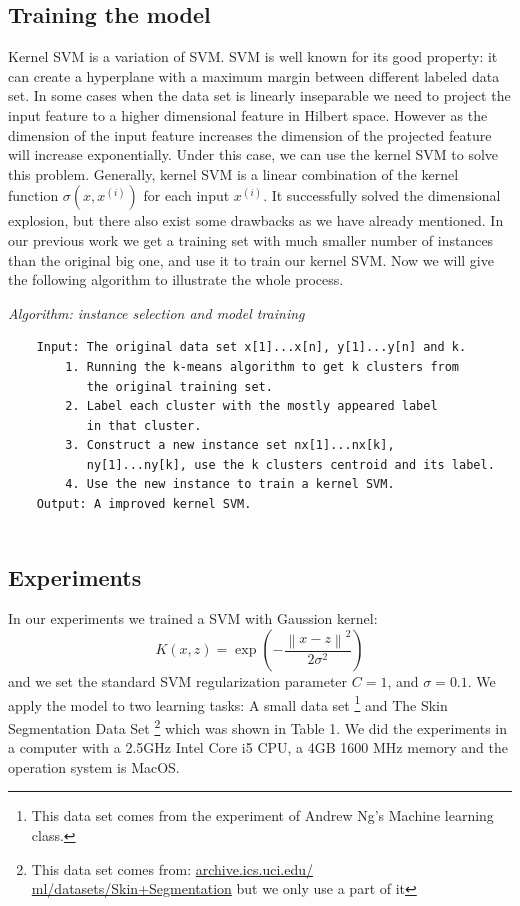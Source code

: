 \documentclass[runningheads,a4paper]{llncs}
\begin{document}
\subsection{Training the model}

		Kernel SVM is a variation of SVM. SVM is well known for its good property: it can create
		a hyperplane with a maximum margin between different labeled data set. In some cases when the data set is linearly 
		inseparable we need to project the input feature to a higher dimensional feature in Hilbert space. However as the
		dimension of the input feature increases the dimension of the projected feature will increase exponentially. Under this 
		case, we can use the kernel SVM to solve this problem. Generally, kernel SVM is a linear combination of the kernel 
		function $\sigma(x,x^{(i)})$ for each input $x^{(i)}$. It successfully solved the dimensional explosion, but there also exist
		some drawbacks as we have already mentioned. In our previous work we get a training set with much smaller number of instances 
		than the original big one, and use it to train our kernel SVM. Now we will give the following algorithm to illustrate the whole process.


\medskip
\noindent
{\it Algorithm: instance selection and model training}
\begin{verbatim}
	Input: The original data set x[1]...x[n], y[1]...y[n] and k.
		1. Running the k-means algorithm to get k clusters from 
		   the original training set.
		2. Label each cluster with the mostly appeared label 
		   in that cluster.
		3. Construct a new instance set nx[1]...nx[k], 
		   ny[1]...ny[k], use the k clusters centroid and its label.
		4. Use the new instance to train a kernel SVM.
	Output: A improved kernel SVM. 
	
\end{verbatim}
\medskip


\subsection{Experiments}

		In our experiments we trained a SVM with Gaussion kernel:
		\[
			K(x,z)=\exp(- \frac{{{{\left\| {x - z} \right\|}^2}}}{{2{\sigma ^2}}})
		\]
		and we set the standard SVM regularization    
		parameter $C=1$, and $\sigma=0.1$. We apply the model to two learning tasks: 
		A small data set \footnote{This data set comes from 
		the experiment of Andrew Ng’s Machine learning class.}
		and The Skin Segmentation Data Set \footnote{This data set comes from: \url{archive.ics.uci.edu/
		ml/datasets/Skin+Segmentation} but we only use a part of it}
		which was shown in Table 1. We did the experiments in a computer with a 2.5GHz Intel Core i5 CPU,
		a 4GB 1600 MHz memory and the operation system is MacOS.    
\end{document}
